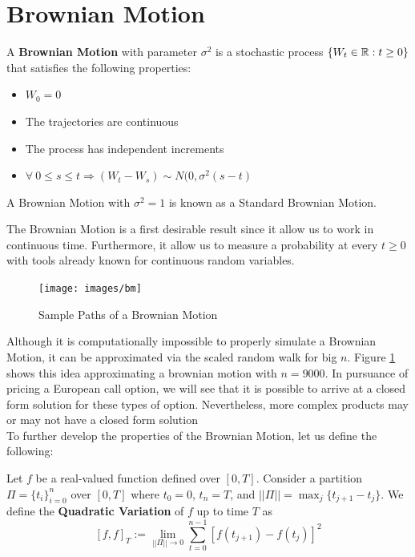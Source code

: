 \documentclass[../TGMAFFIRO]{subfiles}
\begin{document}
\section{Brownian Motion}
\begin{definition}\label{def:brownian_motion}
	A \textbf{Brownian Motion} with parameter $\sigma^2$ is a stochastic process $\{W_t \in \mathbb{R}:t\geq 0\}$ that satisfies the following properties:
	\begin{itemize}
		\item $W_0 = 0$
		\item The trajectories are continuous
		\item The process has independent increments
		\item $\forall \ 0 \leq s \leq t \Longrightarrow (W_t - W_s) \sim N(0, \sigma^2(s - t)$
	\end{itemize}
\end{definition}

\begin{remark}
	A Brownian Motion with $\sigma^2 = 1$ is known as a Standard Brownian Motion.
\end{remark}

The Brownian Motion is a first desirable result since it allow us to work in continuous time. Furthermore, it allow us to measure a probability at every $t\geq 0$ with tools already known for continuous random variables. 

\begin{figure}[h]
	\centering
	\label{fig:Brownian_Motion}
	\texttt{[image: images/bm]}
	\caption{Sample Paths of a Brownian Motion}
\end{figure}

Although it is computationally impossible to properly simulate a Brownian Motion, it can be approximated via the scaled random walk for big $n$. Figure \ref{fig:Brownian_Motion} shows this idea approximating a brownian motion with $n=9000$. In pursuance of pricing a European call option, we will see that it is possible to arrive at a closed form solution for these types of option. Nevertheless, more complex products may or may not have a closed form solution\\

To further develop the properties of the Brownian Motion, let us define the following:
\begin{definition}\label{def:quadratic_variation}
	Let $f$ be a real-valued function defined over $[0, T]$. Consider a partition $\Pi= \{t_i\}_{i=0}^{n}$ over $[0, T]$ where $t_0 = 0$, $t_n = T$, and $||\Pi|| = \max_j\{t_{j+1} - t_j\}$. We define the \textbf{Quadratic Variation} of $f$ up to time $T$ as
	\[
		[f, f]_T := \lim_{||\Pi|| \to 0} \sum_{t=0}^{n-1}\left[f(t_{j+1}) - f(t_{j})\right]^2
	\]
\end{definition}
\end{document}
